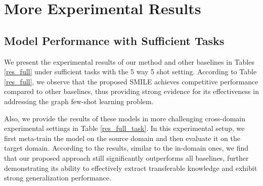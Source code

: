 \section{More Experimental Results}
\label{more_experiment}
\subsection{Model Performance with Sufficient Tasks}
We present the experimental results of our method and other baselines in Tables \ref{res_full} under sufficient tasks with the 5 way 5 shot setting. According to Table \ref{res_full}, we observe that the proposed SMILE achieves competitive performance compared to other baselines, thus providing strong evidence for its effectiveness in addressing the graph few-shot learning problem. %

Also, we provide the results of these models in more challenging cross-domain experimental settings in Table \ref{res_full_task}. In this experimental setup, we first meta-train the model on the source domain and then evaluate it on the target domain. According to the results, similar to the in-domain ones, we find that our proposed approach still significantly outperforms all baselines, %
further demonstrating its ability to effectively extract transferable knowledge and exhibit strong generalization performance.


